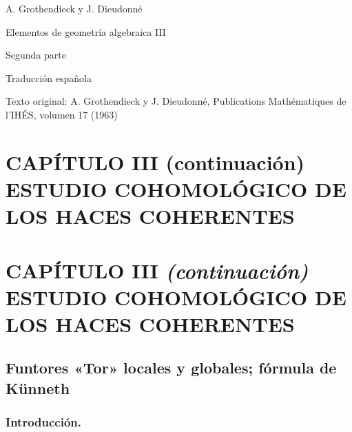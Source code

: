 \documentclass[10pt,oneside,openany]{book}
\theoremstyle{egaenv}\newtheorem*{env}{---}
\theoremstyle{egastatement}
\theoremstyle{egadescription}
\newcommand{\oldpage}[2][]{\marginnote{\normalfont\scriptsize\textbf{#1}\,|\,#2}\ignorespaces}
\begin{document}
\begin{titlepage}
  \centering
  {\Large A. Grothendieck y J. Dieudonné\par}
  \vfill
  {\Huge Elementos de geometría algebraica III\par}
  \vspace{1.5ex}
  {\LARGE Segunda parte\par}
  \vfill
  {\large Traducción española\par}
  \vspace{1ex}
  {\small Texto original: A. Grothendieck y J. Dieudonné, Publications Mathématiques de l’IHÉS, volumen 17 (1963)\par}
\end{titlepage}

\chapter*{CAPÍTULO III (continuación)\\[1.2ex]
\Large ESTUDIO COHOMOLÓGICO DE LOS HACES COHERENTES}

\setcounter{section}{5}
\setcounter{subsection}{0}
\setcounter{equation}{0}
\setcounter{footnote}{0}
\chapter*{CAPÍTULO III \emph{(continuación)}\\[1.2ex]
\Large ESTUDIO COHOMOLÓGICO DE LOS HACES COHERENTES}

\oldpage[III]{137}

\section{Funtores «Tor» locales y globales; fórmula de Künneth}
\label{section:III.6.fr}

\subsection{Introducción.}
\label{subsection:III.6.1.fr}
\end{document}
